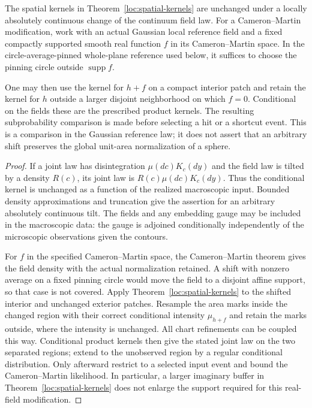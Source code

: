 \begin{corollary}
\label{loc:field-tilt}
The spatial kernels in Theorem~\ref{loc:spatial-kernels} are unchanged
under a locally absolutely continuous change of the continuum field law.
For a Cameron--Martin modification, work with an actual Gaussian local
reference field and a fixed compactly supported smooth real function $f$
in its Cameron--Martin space. In the circle-average-pinned whole-plane
reference used below, it suffices to choose the pinning circle outside
$\operatorname{supp}f$.

One may then use the kernel for $h+f$ on a compact interior patch and
retain the kernel for $h$ outside a larger disjoint neighborhood on which
$f=0$. Conditional on the fields these are the prescribed product
kernels. The resulting subprobability comparison is made before selecting
a hit or a shortcut event. This is a comparison in the Gaussian reference
law; it does not assert that an arbitrary shift preserves the global
unit-area normalization of a sphere.
\end{corollary}
\begin{proof}
If a joint law has disintegration $\mu(dc)K_c(dy)$ and the field law is
tilted by a density $R(c)$, its joint law is
$R(c)\mu(dc)K_c(dy)$.  Thus the conditional kernel is unchanged as a
function of the realized macroscopic input.  Bounded density
approximations and truncation give the assertion for an arbitrary
absolutely continuous tilt.  The fields and any embedding gauge may be
included in the macroscopic data: the gauge is adjoined conditionally
independently of the microscopic observations given the contours.

For $f$ in the specified Cameron--Martin space, the Cameron--Martin
theorem gives the field density with the actual normalization retained.
A shift with nonzero average on a fixed pinning circle would move the
field to a disjoint affine support, so that case is not covered.  Apply
Theorem~\ref{loc:spatial-kernels} to the shifted interior and unchanged
exterior patches.  Resample the area marks inside the changed region
with their correct conditional intensity $\mu_{h+f}$ and retain the
marks outside, where the intensity is unchanged.  All chart refinements
can be coupled this way.  Conditional product kernels then give the
stated joint law on the two separated regions; extend to the unobserved
region by a regular conditional distribution.  Only afterward restrict
to a selected input event and bound the Cameron--Martin likelihood.
In particular, a larger imaginary buffer in
Theorem~\ref{loc:spatial-kernels} does not enlarge the support required
for this real-field modification.
\end{proof}

